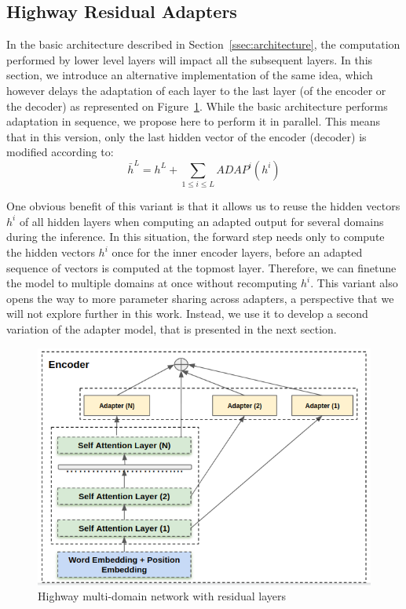 \documentclass[11pt,a4paper]{article}
\begin{document}
\subsection{Highway Residual Adapters \label{ssec:highway}}

In the basic architecture described in Section~\ref{ssec:architecture}, the computation performed by lower level layers will impact all the subsequent layers. In this section, we introduce an alternative implementation of the same idea, which however delays the adaptation of each layer to the last layer (of the encoder or the decoder) as represented on Figure~\ref{fig:hrl-architecture}. While the basic architecture performs adaptation in sequence, we propose here to perform it in parallel. This means that in this version, only the last hidden vector of the encoder (decoder) is modified according to:
\begin{equation}
  \bar{h}^L = h^L + \displaystyle{\mathop{\sum}_{1 \leq i \leq L} ADAP^i(h^i)} \label{eq:highway-output}
\end{equation}

One obvious benefit of this variant is that it allows us to reuse the hidden vectors $h^i$ of all hidden layers when computing an adapted output for several domains during the inference. In this situation, the forward step needs only to compute the hidden vectors $h^i$ once for the inner encoder layers, before an adapted sequence of vectors is computed at the topmost layer. Therefore, we can finetune the model to multiple domains at once without recomputing $h^i$. This variant also opens the way to more parameter sharing across adapters, a perspective that we will not explore further in this work. Instead, we use it to develop a second variation of the adapter model, that is presented in the next section.

\begin{figure}[htbp]
  \centering
  \includegraphics[scale=0.3]{fig/highway_residual}
  \caption{Highway multi-domain network with residual layers}
  \label{fig:hrl-architecture}
\end{figure}
\end{document}

